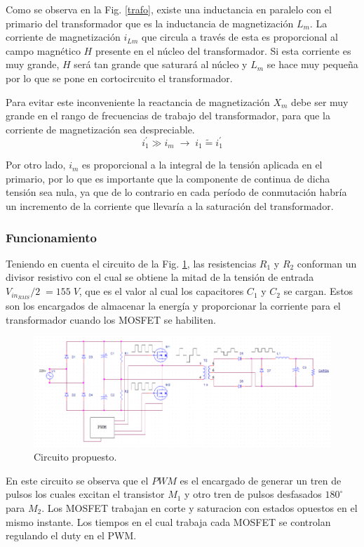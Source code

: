 \documentclass[11pt, a4paper]{article}
\begin{document}
Como se observa en la Fig. \ref{trafo}, existe una inductancia en paralelo con el primario del transformador que es la inductancia de magnetización $L_m$. La corriente de magnetización $i_{Lm}$ que circula a través de esta es proporcional al campo magnético $H$ presente en el núcleo del transformador. Si esta corriente es muy grande, $H$ será tan grande que saturará al núcleo y $L_m$ se hace muy pequeña por lo que se pone en cortocircuito el transformador.

Para evitar este inconveniente la reactancia de magnetización $X_m$ debe ser muy grande en el rango de frecuencias de trabajo del transformador, para que la corriente de magnetización sea despreciable.
\[ i_{1}^{'} \gg i_m \; \rightarrow \; i_1 \tilde{=}  i_{1}^{'}  \]  

Por otro lado, $i_m$ es proporcional a la integral de la tensión aplicada en el primario, por lo que es importante que la componente de continua de dicha tensión sea nula, ya que de lo contrario en cada período de conmutación habría un incremento de la corriente que llevaría a la saturación del transformador.

\subsubsection{Funcionamiento}
Teniendo en cuenta el circuito de la Fig. \ref{propuesto}, las resistencias $R_1$ y $R_2$ conforman un divisor resistivo con el cual se obtiene la mitad de la tensión de entrada ${V_{in_{RMS}}}/{2} \; = 155 \; V$, que es el valor al cual los capacitores $C_1$ y $C_2$ se cargan. Estos son los encargados de almacenar la energía y proporcionar la corriente para el transformador cuando los MOSFET se habiliten.  

\begin{figure}[h]
	\centering
	\includegraphics[width = \textwidth ]{Imagenes/funcionamiento}
	\caption{Circuito propuesto.}
	\label{propuesto}
\end{figure}

En este circuito se observa que el $PWM$ es el encargado de generar un tren de pulsos los cuales excitan el transistor $M_1$ y otro tren de pulsos desfasados $180^{\circ}$ para $M_2$. Los MOSFET trabajan en corte y saturacion con estados opuestos en el mismo instante. Los tiempos en el cual trabaja cada MOSFET se controlan regulando el duty en el PWM.
\end{document}
